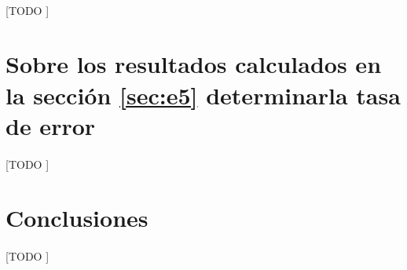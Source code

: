 \documentclass{article}
\begin{document}
		\paragraph{}
		[TODO ]


	\section{Sobre los resultados calculados en la sección \ref{sec:e5} determinarla tasa de error}
	\label{sec:e6}

		\paragraph{}
		[TODO ]

	\section{Conclusiones}
	\label{sec:conclusions}

		\paragraph{}
		[TODO ]

	\nocite{subject:taa}
	\nocite{tool:weka}
  
  
\end{document}

